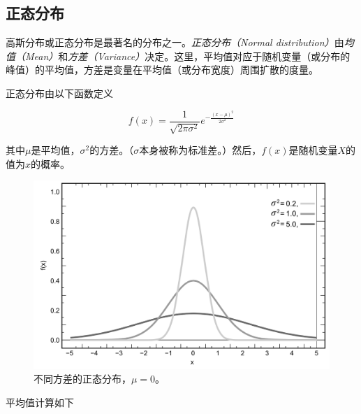 
\subsection{正态分布}
高斯分布或正态分布是最著名的分布之一。\emph{正态分布（Normal distribution）}由\emph{均值（Mean）}和\emph{方差（Variance）}决定。这里，平均值对应于随机变量（或分布的峰值）的平均值，方差是变量在平均值（或分布宽度）周围扩散的度量。

正态分布由以下函数定义

\begin{equation}
f(x)=\frac{1}{\sqrt{2\pi\sigma^2}}e^{-\frac{(x-\mu)^2}{2\sigma^2}}
\end{equation}


其中$\mu$是平均值，$\sigma^2$的方差。（$\sigma$本身被称为标准差。）然后，$f(x)$是随机变量$X$的值为$x$的概率。

\begin{figure}
	\centering
		\includegraphics[width=\textwidth]{figs/Normal_Distribution_PDF}
	\caption{不同方差的正态分布，$\mu=0$。}
	\label{fig:Normal_Distribution_PDF}
\end{figure}


平均值计算如下

